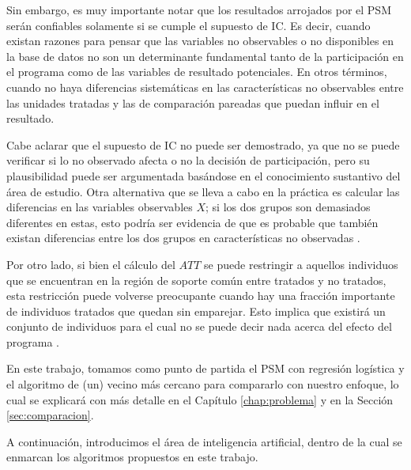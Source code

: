 \documentclass[../../main.tex]{subfiles}
\begin{document}
Sin embargo, es muy importante notar que los resultados arrojados por el PSM serán
confiables solamente si se cumple el supuesto de IC. Es decir, cuando existan razones para
pensar que las variables no observables o no disponibles en la base de datos no son un
determinante fundamental tanto de la participación en el programa como de las variables de
resultado potenciales. En otros términos, cuando no haya diferencias sistemáticas en las
características no observables entre las unidades tratadas y las de comparación pareadas
que puedan influir en el resultado.

Cabe aclarar que el supuesto de IC no puede ser demostrado, ya que no se puede verificar
si lo no observado afecta o no la decisión de participación, pero su plausibilidad puede
ser argumentada basándose en el conocimiento sustantivo del área de estudio. Otra
alternativa que se lleva a cabo en la práctica es calcular las diferencias en las
variables observables \(X\); si los dos grupos son demasiados diferentes en estas, esto
podría ser evidencia de que es probable que también existan diferencias entre los dos
grupos en características no observadas \cite{bernal}.

Por otro lado, si bien el cálculo del \(ATT\) se puede restringir a aquellos individuos
que se encuentran en la región de soporte común entre tratados y no tratados, esta
restricción puede volverse preocupante cuando hay una fracción importante de individuos
tratados que quedan sin emparejar. Esto implica que existirá un conjunto de individuos
para el cual no se puede decir nada acerca del efecto del programa \cite{bernal}.

\bigskip
En este trabajo, tomamos como punto de partida el PSM con regresión logística y el
algoritmo de (un) vecino más cercano para compararlo con nuestro enfoque, lo cual se
explicará con más detalle en el Capítulo \ref{chap:problema} y en la Sección
\ref{sec:comparacion}.

A continuación, introducimos el área de inteligencia artificial, dentro de la cual se
enmarcan los algoritmos propuestos en este trabajo.
\end{document}
